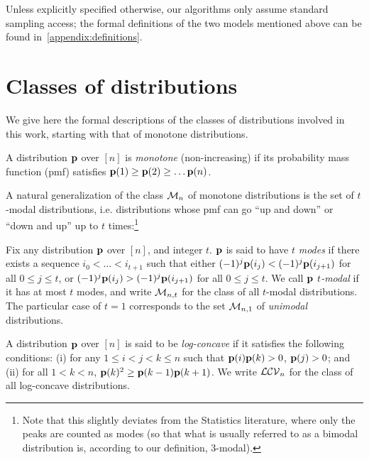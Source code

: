 Unless explicitly specified otherwise, our algorithms only assume standard sampling access; the formal definitions of the two models mentioned above can be found in~\cref{appendix:definitions}.

\section{Classes of distributions}\label{ssec:class:definitions}

We give here the formal descriptions of the classes of distributions involved in this work, starting with that of monotone distributions.
\begin{definition}[monotone]\label{def:monotone}
A distribution $\mathbf{p}$ over $[n]$ is \emph{monotone} (non-increasing) if its probability mass function (pmf) satisfies $\mathbf{p}(1) \geq \mathbf{p}(2) \geq \dots \mathbf{p}(n)$.
\end{definition}
 A natural generalization of the class $\mathcal{M}_{n}$ of monotone distributions is the set of $t$-modal distributions, i.e. distributions whose pmf can go ``up and down'' or ``down and up'' up to $t$ times:\footnote{Note that this slightly deviates from the Statistics literature, where only the peaks are counted as modes (so that what is usually referred to as a bimodal distribution is, according to our definition, $3$-modal).}

\begin{definition}[$t$-modal]\label{def:tmodal}
  Fix any distribution $\mathbf{p}$ over $[n]$, and integer $t$. $\mathbf{p}$ is said to have $t$ \emph{modes} if there exists a sequence $i_0 < \dots < i_{t+1}$ such 
  that either $(-1)^j \mathbf{p}(i_j) < (-1)^j \mathbf{p}(i_{j+1})$ for all $0\leq j \leq t$, or $(-1)^j \mathbf{p}(i_j) > (-1)^j \mathbf{p}(i_{j+1})$ for all $0\leq j \leq t$. We call $\mathbf{p}$ \emph{$t$-modal} if it has at most $t$ modes, and write $\mathcal{M}_{n,t}$ for the class of all $t$-modal distributions. The particular case of $t=1$ corresponds to the set $\mathcal{M}_{n,1}$ of \emph{unimodal} distributions.
\end{definition}

\begin{definition}\label{def:logconcave}
  A distribution $\mathbf{p}$ over $[n]$ is said to be \emph{log-concave} if it satisfies the following conditions: \textsf{(i)} for any $1 \leq i < j < k \leq n$ such that $\mathbf{p}(i)\mathbf{p}(k) > 0$, $\mathbf{p}(j) > 0$; and \textsf{(ii)} for all $1 < k < n$, $\mathbf{p}(k)^2 \geq \mathbf{p}(k-1)\mathbf{p}(k+1)$. We write $\mathcal{LCV}_{n}$ for the class of all log-concave distributions.
\end{definition}

